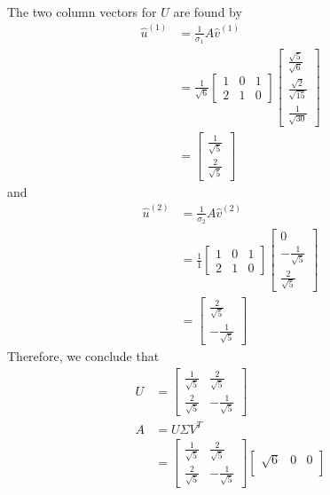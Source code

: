 \begin{solution}
\begin{align*}
\end{align*}
The two column vectors for $U$ are found by
\begin{align*}
\hat{u}^{(1)} &= \frac{1}{\sigma_1} A\hat{v}^{(1)} \\
&= \frac{1}{\sqrt{6}}
\begin{bmatrix}
1 & 0 & 1\\
2 & 1 & 0
\end{bmatrix}
\begin{bmatrix}
\frac{\sqrt{5}}{\sqrt{6}} \\
\frac{\sqrt{2}}{\sqrt{15}} \\
\frac{1}{\sqrt{30}}
\end{bmatrix} \\
&=
\begin{bmatrix}
\frac{1}{\sqrt{5}} \\
\frac{2}{\sqrt{5}}
\end{bmatrix}
\end{align*}
and
\begin{align*}
\hat{u}^{(2)} &= \frac{1}{\sigma_2} A\hat{v}^{(2)} \\ 
&= \frac{1}{1}
\begin{bmatrix}
1 & 0 & 1\\
2 & 1 & 0
\end{bmatrix}
\begin{bmatrix}
0 \\
-\frac{1}{\sqrt{5}} \\
\frac{2}{\sqrt{5}}
\end{bmatrix} \\
&= 
\begin{bmatrix}
\frac{2}{\sqrt{5}} \\
-\frac{1}{\sqrt{5}}
\end{bmatrix}
\end{align*}
Therefore, we conclude that
\begin{align*}
U &=
\begin{bmatrix}
\frac{1}{\sqrt{5}} & \frac{2}{\sqrt{5}} \\
\frac{2}{\sqrt{5}} & -\frac{1}{\sqrt{5}}
\end{bmatrix} \\
A &= U\Sigma V^T \\
&= 
\begin{bmatrix}
\frac{1}{\sqrt{5}} & \frac{2}{\sqrt{5}} \\
\frac{2}{\sqrt{5}} & -\frac{1}{\sqrt{5}}
\end{bmatrix}
\begin{bmatrix}
\sqrt{6} & 0 & 0 \\

\end{bmatrix}
\end{align*}
\end{solution}
